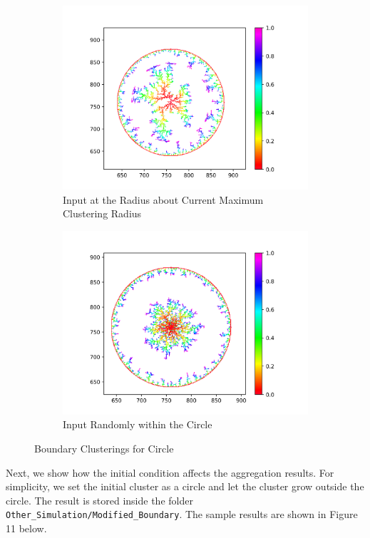 \documentclass[10pt]{article}
\begin{document}
\begin{figure}[h]
	\centering
	\begin{subfigure}[b]{0.3\textwidth}
		\centering
		\includegraphics[width=\textwidth]{Figure_14}
		\caption{Input at the Radius about Current Maximum Clustering Radius}
	\end{subfigure}
	\begin{subfigure}[b]{0.3\textwidth}
		\centering
		\includegraphics[width=\textwidth]{Figure_15}
		\caption{Input Randomly within the Circle}
		\end{subfigure}
		\caption{Boundary Clusterings for Circle}
\end{figure}

Next, we show how the initial condition affects the aggregation results. For simplicity, we set the initial cluster as a circle and let the cluster grow outside the circle. The result is stored inside the folder \texttt{Other\_Simulation/Modified\_Boundary}. The sample results are shown in Figure 11 below.
\end{document}
